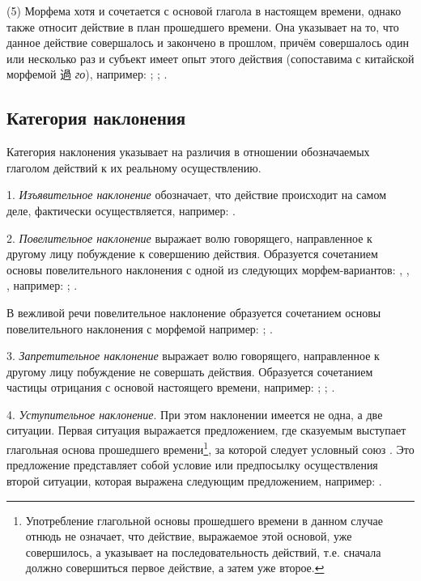 (5)	Морфема  хотя и сочетается с основой глагола в настоящем времени, однако также относит действие в план прошедшего времени. Она указывает на то, что данное действие совершалось и закончено в прошлом, причём совершалось один или несколько раз и субъект имеет опыт этого
действия (сопоставима с китайской морфемой {\chinfont 過} \emph{го}), например:
;
;
.

\subsection{Категория наклонения}

Категория наклонения указывает на различия в отношении обозначаемых глаголом действий к их реальному осуществлению.

1. \emph{Изъявительное наклонение} обозначает, что действие происходит на самом деле, фактически осуществляется, например:
.

2. \emph{Повелительное наклонение} выражает волю говорящего, направленное к другому лицу побуждение к совершению действия. Образуется сочетанием основы повелительного наклонения с одной из следующих морфем-вариантов:
, , , например:
;
.

В вежливой речи повелительное наклонение образуется сочетанием основы повелительного наклонения с морфемой  например:
;
.

3. \emph{Запретительное наклонение} выражает волю говорящего, направленное к другому лицу побуждение не совершать действия. Образуется сочетанием частицы отрицания с основой настоящего времени, например:
;
;
.

4. \emph{Уступительное наклонение}. При этом наклонении имеется не одна, а две ситуации. Первая ситуация выражается предложением, где сказуемым выступает глагольная основа прошедшего времени\footnote[39]{Употребление глагольной основы прошедшего времени в данном случае отнюдь не означает, что действие, выражаемое этой основой, уже совершилось, а указывает на последовательность действий, т.е. сначала должно совершиться первое действие, а затем уже второе.}, за которой следует условный союз . Это предложение представляет собой условие или предпосылку осуществления второй ситуации, которая выражена следующим предложением, например:
.

